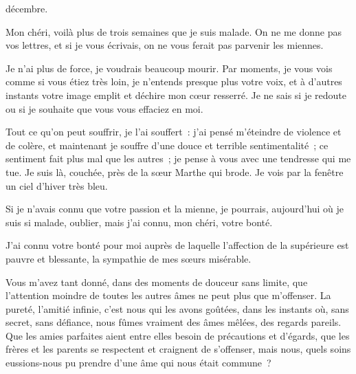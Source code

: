 
{

{ décembre.
\par}

Mon chéri, voilà plus de trois semaines que je suis malade. On ne me
donne pas vos lettres, et si je vous écrivais, on ne vous ferait pas
parvenir les miennes.

Je n'ai plus de force, je voudrais beaucoup mourir. Par moments, je
vous vois comme si vous étiez très loin, je n'entends presque plus
votre voix, et à d'autres instants votre image emplit et déchire mon
cœur resserré. Je ne sais si je redoute ou si je souhaite que vous
vous effaciez en moi.

Tout ce qu'on peut souffrir, je l'ai souffert~: j'ai pensé m'éteindre
de violence et de colère, et maintenant je souffre d'une douce et
terrible sentimentalité~; ce sentiment fait plus mal que les autres~;
je pense à vous avec une tendresse qui me tue. Je suis là, couchée,
près de la sœur Marthe qui brode. Je vois par la fenêtre un ciel
d'hiver très bleu.

Si je n'avais connu que votre passion et la mienne, je pourrais,
aujourd'hui où je suis si malade, oublier, mais j'ai connu, mon
chéri, votre bonté.

J'ai connu votre bonté pour moi auprès de laquelle l'affection de la
supérieure est pauvre et blessante, la sympathie de mes sœurs
misérable.

Vous m'avez tant donné, dans des moments de douceur sans limite, que
l'attention moindre de toutes les autres âmes ne peut plus que
m'offenser. La pureté, l'amitié infinie, c'est nous qui les avons
goûtées, dans les instants où, sans secret, sans défiance, nous fûmes
vraiment des âmes mêlées, des regards pareils. Que les amies
parfaites aient entre elles besoin de précautions et d'égards, que
les frères et les parents se respectent et craignent de s'offenser,
mais nous, quels soins eussions-nous pu prendre d'une âme qui nous
était commune~?

}
